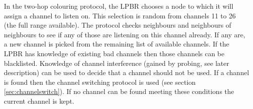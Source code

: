 In the two-hop colouring protocol, the LPBR chooses a node to which it will assign a channel to listen on.  
This selection is random from channels 11 to 26 (the full range available). The protocol checks neighbours and neighbours of neighbours to see if any of those are listening on this channel already. If any are, a new channel is picked from the remaining list of available channels. If the LPBR has knowledge of existing bad channels then those channels can be blacklisted.  Knowledge of channel interference (gained by probing, see later description) can be used to decide that a channel should not be used. If a channel is found then the channel switching protocol is used (see section \ref{sec:channelswitch}). If no channel can be found meeting these conditions the current
channel is kept.  

